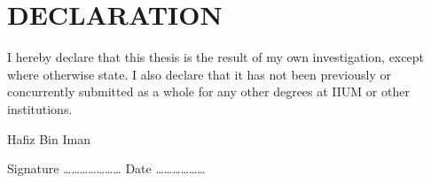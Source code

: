 
\chapter*{DECLARATION}
\noindent
I hereby declare that this thesis is the result
of my own investigation, except where otherwise state.
I also declare that it has not been previously or 
concurrently submitted as a whole for any other degrees
at IIUM or other institutions.
\vspace{24pt}
\par
\noindent
Hafiz Bin Iman
\vspace{24pt}
\par
\noindent
Signature \ldots\ldots\ldots\ldots\ldots\ldots\ldots \hfill \hfill 
Date \ldots\ldots\ldots\ldots\ldots\ldots
\newpage

